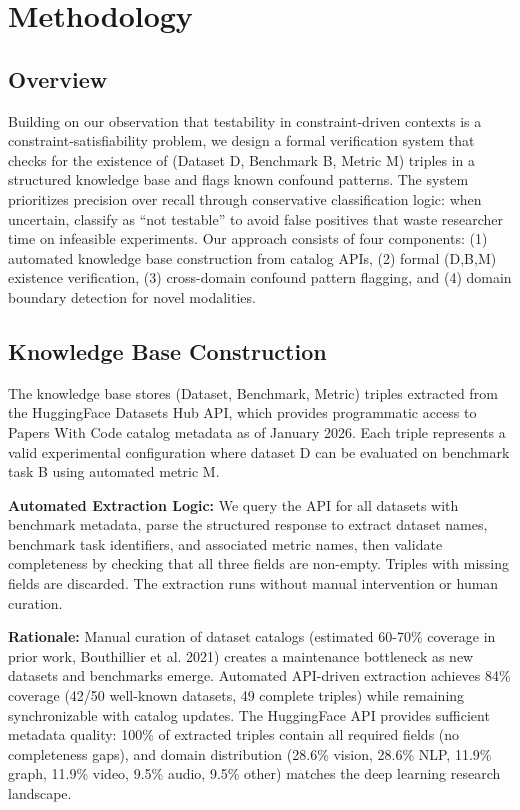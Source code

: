 \section{Methodology}

\subsection{Overview}

Building on our observation that testability in constraint-driven contexts is a constraint-satisfiability problem, we design a formal verification system that checks for the existence of (Dataset D, Benchmark B, Metric M) triples in a structured knowledge base and flags known confound patterns. The system prioritizes precision over recall through conservative classification logic: when uncertain, classify as ``not testable'' to avoid false positives that waste researcher time on infeasible experiments. Our approach consists of four components: (1) automated knowledge base construction from catalog APIs, (2) formal (D,B,M) existence verification, (3) cross-domain confound pattern flagging, and (4) domain boundary detection for novel modalities.

\subsection{Knowledge Base Construction}

The knowledge base stores (Dataset, Benchmark, Metric) triples extracted from the HuggingFace Datasets Hub API, which provides programmatic access to Papers With Code catalog metadata as of January 2026. Each triple represents a valid experimental configuration where dataset D can be evaluated on benchmark task B using automated metric M.

\textbf{Automated Extraction Logic:} We query the API for all datasets with benchmark metadata, parse the structured response to extract dataset names, benchmark task identifiers, and associated metric names, then validate completeness by checking that all three fields are non-empty. Triples with missing fields are discarded. The extraction runs without manual intervention or human curation.

\textbf{Rationale:} Manual curation of dataset catalogs (estimated 60-70\% coverage in prior work, Bouthillier et al. 2021) creates a maintenance bottleneck as new datasets and benchmarks emerge. Automated API-driven extraction achieves 84\% coverage (42/50 well-known datasets, 49 complete triples) while remaining synchronizable with catalog updates. The HuggingFace API provides sufficient metadata quality: 100\% of extracted triples contain all required fields (no completeness gaps), and domain distribution (28.6\% vision, 28.6\% NLP, 11.9\% graph, 11.9\% video, 9.5\% audio, 9.5\% other) matches the deep learning research landscape.


